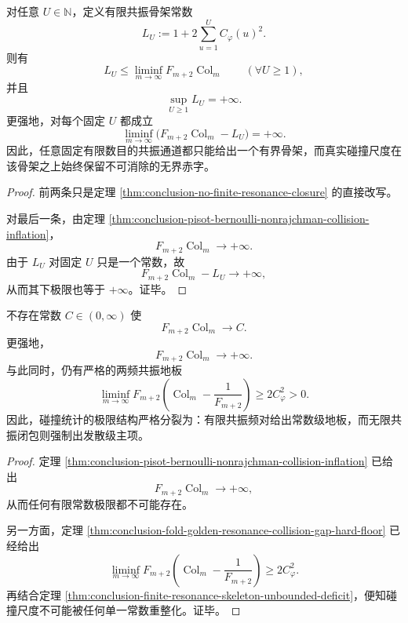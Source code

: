 \begin{theorem}[有限共振骨架的无界赤字律]\label{thm:conclusion-finite-resonance-skeleton-unbounded-deficit}
对任意 \(U\in\mathbb N\)，定义有限共振骨架常数
\[
L_U:=1+2\sum_{u=1}^{U}C_\varphi(u)^2.
\]
则有
\[
L_U\le \liminf_{m\to\infty}F_{m+2}\operatorname{Col}_m
\qquad(\forall U\ge 1),
\]
并且
\[
\sup_{U\ge 1}L_U=+\infty.
\]
更强地，对每个固定 \(U\) 都成立
\[
\liminf_{m\to\infty}\bigl(F_{m+2}\operatorname{Col}_m-L_U\bigr)=+\infty.
\]
因此，任意固定有限数目的共振通道都只能给出一个有界骨架，而真实碰撞尺度在该骨架之上始终保留不可消除的无界赤字。
\end{theorem}
\begin{proof}
前两条只是定理 \ref{thm:conclusion-no-finite-resonance-closure} 的直接改写。

对最后一条，由定理 \ref{thm:conclusion-pisot-bernoulli-nonrajchman-collision-inflation}，
\[
F_{m+2}\operatorname{Col}_m\longrightarrow+\infty.
\]
由于 \(L_U\) 对固定 \(U\) 只是一个常数，故
\[
F_{m+2}\operatorname{Col}_m-L_U\longrightarrow+\infty,
\]
从而其下极限也等于 \(+\infty\)。证毕。
\end{proof}

\begin{corollary}[碰撞尺度不存在单常数型重整化]\label{cor:conclusion-collision-scale-no-single-constant-renormalization}
不存在常数 \(C\in(0,\infty)\) 使
\[
F_{m+2}\operatorname{Col}_m\longrightarrow C.
\]
更强地，
\[
F_{m+2}\operatorname{Col}_m\longrightarrow+\infty.
\]
与此同时，仍有严格的两频共振地板
\[
\liminf_{m\to\infty}
F_{m+2}\!\left(\operatorname{Col}_m-\frac1{F_{m+2}}\right)
\ge
2C_\varphi^2>0.
\]
因此，碰撞统计的极限结构严格分裂为：有限共振频对给出常数级地板，而无限共振闭包则强制出发散级主项。
\end{corollary}
\begin{proof}
定理 \ref{thm:conclusion-pisot-bernoulli-nonrajchman-collision-inflation} 已给出
\[
F_{m+2}\operatorname{Col}_m\to+\infty,
\]
从而任何有限常数极限都不可能存在。

另一方面，定理 \ref{thm:conclusion-fold-golden-resonance-collision-gap-hard-floor} 已经给出
\[
\liminf_{m\to\infty}
F_{m+2}\!\left(\operatorname{Col}_m-\frac1{F_{m+2}}\right)\ge 2C_\varphi^2.
\]
再结合定理 \ref{thm:conclusion-finite-resonance-skeleton-unbounded-deficit}，便知碰撞尺度不可能被任何单一常数重整化。证毕。
\end{proof}

